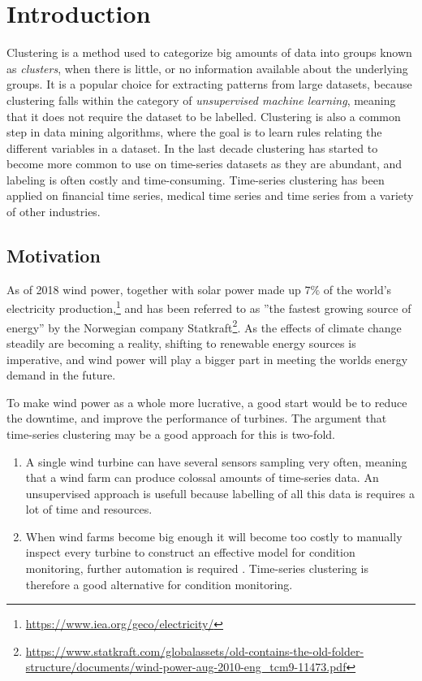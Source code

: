 \chapter{Introduction} \label{chap:intro}

Clustering is a method used to categorize big amounts of data into groups known as \textit{clusters}, when there is little, or no information available about the underlying groups. 
It is a popular choice for extracting patterns from large datasets, because clustering falls within the category of \textit{unsupervised machine learning}, meaning that it does not require the dataset to be labelled. 
Clustering is also a common step in data mining algorithms, where the goal is to learn rules relating the different variables in a dataset. 
In the last decade clustering has started to become more common to use on time-series datasets as they are abundant, and labeling is often costly and time-consuming. 
Time-series clustering has been applied on financial time series, medical time series and time series from a variety of other industries. \bigskip

\section{Motivation}

As of 2018 wind power, together with solar power made up $7\%$ of the world's electricity production,\footnote{\url{https://www.iea.org/geco/electricity/}} and has been referred to as ''the fastest growing source of energy'' by the Norwegian company Statkraft\footnote{\url{https://www.statkraft.com/globalassets/old-contains-the-old-folder-structure/documents/wind-power-aug-2010-eng_tcm9-11473.pdf}}. 
As the effects of climate change steadily are becoming a reality, shifting to renewable energy sources is imperative, and wind power will play a bigger part in meeting the worlds energy demand in the future. \bigskip

To make wind power as a whole more lucrative, a good start would be to reduce the downtime, and improve the performance of turbines. The argument that time-series clustering may be a good approach for this is two-fold. 

\begin{enumerate}
    \item A single wind turbine can have several sensors sampling very often, meaning that a wind farm can produce colossal amounts of time-series data. An unsupervised approach is usefull because labelling of all this data is requires a lot of time and resources.
    \item When wind farms become big enough it will become too costly to manually inspect every turbine to construct an effective model for condition monitoring, further automation is required \cite{espen}. Time-series clustering is therefore a good alternative for condition monitoring.
\end{enumerate}

